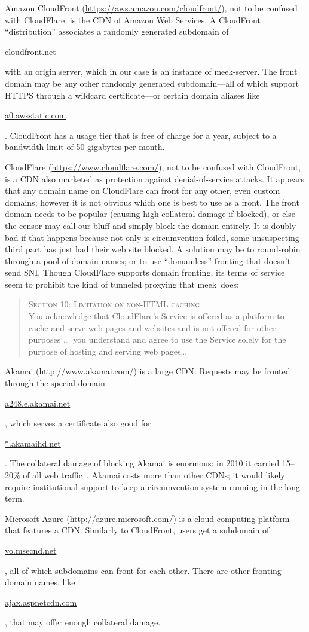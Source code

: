 \documentclass[conference]{IEEEtran}
\def\meekserver{\mbox{meek-server}}
\def\meek{meek}
\def\urll#1{\begin{NoHyper}\url{#1}\end{NoHyper}}
\begin{document}
Amazon CloudFront (\url{https://aws.amazon.com/cloudfront/}),
not to be confused with CloudFlare,
is the CDN of Amazon Web Services.
A CloudFront ``distribution'' associates
a randomly generated subdomain of \urll{cloudfront.net}
with an origin server,
which in our case is an instance of \meekserver.
The front domain may be any other randomly generated subdomain---all
of which support HTTPS through a wildcard certificate---or
certain domain aliases like \urll{a0.awsstatic.com}.
CloudFront has a usage tier that is free of charge for a year,
subject to a bandwidth limit of 50 gigabytes per month.

CloudFlare (\url{https://www.cloudflare.com/}),
not to be confused with CloudFront,
is a CDN also marketed as protection against
denial-of-service attacks.
It appears that any domain name on CloudFlare
can front for any other, even custom domains;
however it is not obvious which one is best to use as a front.
The front domain needs to be popular
(causing high collateral damage if blocked),
or else the censor may call our bluff and simply block the domain entirely.
It is doubly bad if that happens because not only is circumvention foiled,
some unsuspecting third part has just had their web site blocked.
A solution may be to round-robin through
a pool of domain names;
or to use ``domainless'' fronting that doesn't send SNI.
Though CloudFlare supports domain fronting,
its terms of service~\cite{cloudflare-terms}
seem to prohibit the kind of tunneled proxying that \meek\ does:
\begin{quote}
\textsc{Section 10: Limitation on non-HTML caching}\\
You acknowledge that CloudFlare's Service is offered as a platform to cache and
serve web pages and websites and is not offered for other purposes
\ldots\ you understand and agree to use the Service solely
for the purpose of hosting and serving web pages\ldots
\end{quote}

Akamai (\url{http://www.akamai.com/}) is a large CDN.
Requests may be fronted through the special domain
\urll{a248.e.akamai.net},
which serves a certificate also good for \urll{*.akamaihd.net}.
The collateral damage of blocking Akamai is enormous:
in 2010 it carried 15--20\% of all web traffic~\cite{akamai}.
Akamai costs more than other CDNs;
it would likely require institutional support
to keep a circumvention system running in the long term.

Microsoft Azure (\url{http://azure.microsoft.com/})
is a cloud computing platform that features a CDN.
Similarly to CloudFront, users get a subdomain
of \urll{vo.msecnd.net},
all of which subdomains can front for each other.
There are other fronting domain names, like \urll{ajax.aspnetcdn.com},
that may offer enough collateral damage.
\end{document}

